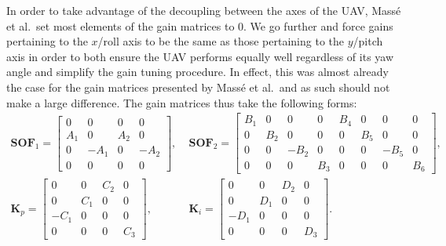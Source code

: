 \documentclass[a4paper,12pt]{article}
\begin{document}
        In order to take advantage of the decoupling between the axes of the UAV, Mass{\'e} et al.\ set most elements of the gain matrices to 0. We go further and force gains pertaining to the \(x\)/roll axis to be the same as those pertaining to the \(y\)/pitch axis in order to both ensure the UAV performs equally well regardless of its yaw angle and simplify the gain tuning procedure. In effect, this was almost already the case for the gain matrices presented by Mass{\'e} et al.\ and as such should not make a large difference. The gain matrices thus take the following forms:
        \begin{align}
            \mathbf{SOF}_1 =
            \begin{bmatrix}
                0   &  0   & 0   & 0    \\
                A_1 &  0   & A_2 & 0    \\
                0   & -A_1 & 0   & -A_2 \\
                0   &  0   & 0   & 0 
            \end{bmatrix},& \;
            \mathbf{SOF}_2 =
            \begin{bmatrix}
                B_1 & 0   &  0   & 0   & B_4 & 0   &  0   & 0 \\
                0   & B_2 &  0   & 0   & 0   & B_5 &  0   & 0 \\
                0   & 0   & -B_2 & 0   & 0   & 0   & -B_5 & 0 \\
                0   & 0   &  0   & B_3 & 0   & 0   &  0   & B_6 
            \end{bmatrix}, \\
            \mathbf{K}_p =
            \begin{bmatrix}
                0   & 0   & C_2 & 0 \\
                0   & C_1 & 0   & 0 \\
               -C_1 & 0   & 0   & 0 \\
                0   & 0   & 0   & C_3 
            \end{bmatrix},& \;
            \mathbf{K}_i =
            \begin{bmatrix}
                0   & 0   & D_2 & 0 \\
                0   & D_1 & 0   & 0 \\
               -D_1 & 0   & 0   & 0 \\
                0   & 0   & 0   & D_3 
            \end{bmatrix}.
        \end{align}
\end{document}
